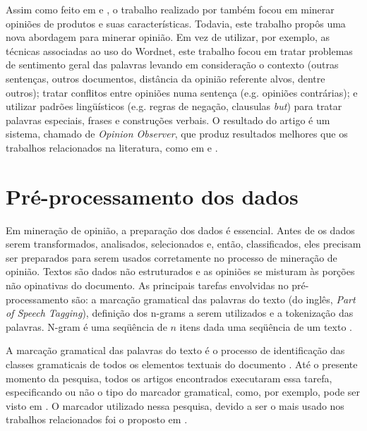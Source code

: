\documentclass[template.tex]{subfiles}
\begin{document}
Assim como feito em \cite{Hu:2004} e \cite{kim2004determining}, o trabalho realizado por \cite{ding2008holistic} também focou em minerar opiniões de produtos e suas características. Todavia, este trabalho propôs uma nova abordagem para minerar opinião. Em vez de utilizar, por exemplo, as técnicas associadas ao uso do Wordnet, este trabalho focou em tratar problemas de sentimento geral das palavras levando em consideração o contexto (outras sentenças, outros documentos, distância da opinião referente alvos, dentre outros); tratar conflitos entre opiniões numa sentença (e.g. opiniões contrárias); e utilizar padrões lingüísticos (e.g. regras de negação, clausulas \textit{but}) para tratar palavras especiais, frases e construções verbais. O resultado do artigo é um sistema, chamado de \textit{Opinion Observer}, que produz resultados melhores que os trabalhos relacionados na literatura, como em \cite{Hu:2004} e  \cite{kim2004determining}.

\section{Pré-processamento dos dados}

Em mineração de opinião, a preparação dos dados é essencial. Antes de os dados serem transformados, analisados, selecionados e, então, classificados, eles precisam ser preparados para serem usados corretamente no processo de mineração de opinião. Textos são dados não estruturados e as opiniões se misturam às porções não opinativas do documento. As principais tarefas envolvidas no pré-processamento são: a marcação gramatical das palavras do texto (do inglês, \textit{Part of Speech Tagging}), definição dos n-grams a serem utilizados e a tokenização das palavras. N-gram é uma seqüência de $n$ itens dada uma seqüência de um texto \cite{dave2003mining}. 

A marcação gramatical das palavras do texto é o processo de identificação das classes gramaticais de todos os elementos textuais do documento \cite{brill1995transformation}. Até o presente momento da pesquisa, todos os artigos encontrados executaram essa tarefa, especificando ou não o tipo do marcador gramatical, como, por exemplo, pode ser visto em \cite{pang2002thumbs, turney2002thumbs, wilson2005recognizing, chaovalit2005movie}. O marcador utilizado nessa pesquisa, devido a ser o mais usado nos trabalhos relacionados foi o proposto em \cite{brill1995transformation}.
\end{document}
